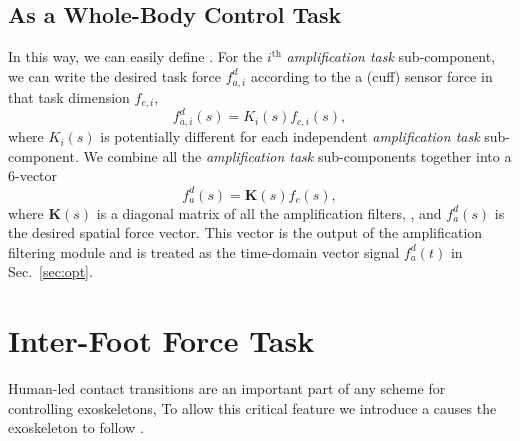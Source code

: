 \subsection{As a Whole-Body Control Task}\label{sec:fd_task}
In this way, we can easily define . For the $i^{\mathrm{th}}$ \emph{amplification task} sub-component, we can write the desired task force $f_{a,i}^d$ according to the a (cuff) sensor force in that task dimension $f_{c,i}$,
\begin{equation}
f_{a,i}^d(s) = K_i(s)f_{c,i}(s),
\end{equation}
where $K_i(s)$ is potentially different for each independent \emph{amplification task} sub-component. We combine all the \emph{amplification task} sub-components together into a 6-vector
\begin{equation}
f_a^d(s) = \mathbf K(s)f_c(s), \label{eq:amplification_task_desired}
\end{equation}
where $\mathbf K(s)$ is a diagonal matrix of all the amplification filters, , and $f_a^d(s)$ is the desired  spatial force vector. This vector is the output of the amplification filtering module and is treated as the time-domain vector signal $f_a^d(t)$ in Sec.~\ref{sec:opt}.




\section{Inter-Foot Force Task}\label{sec:ift}


Human-led  contact transitions are an important part of any scheme for controlling  exoskeletons,  To allow this critical feature we introduce a  causes the exoskeleton to follow .

